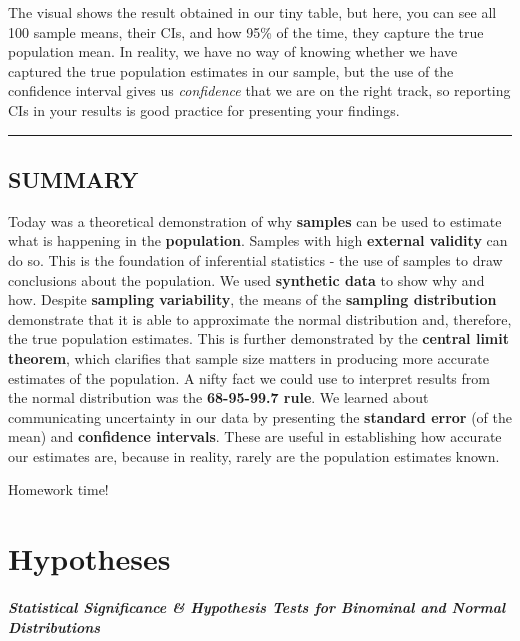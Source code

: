 \documentclass[
]{book}
\begin{document}
The visual shows the result obtained in our tiny table, but here, you can see all 100 sample means, their CIs, and how 95\% of the time, they capture the true population mean. In reality, we have no way of knowing whether we have captured the true population estimates in our sample, but the use of the confidence interval gives us \emph{confidence} that we are on the right track, so reporting CIs in your results is good practice for presenting your findings.

\begin{center}\rule{0.5\linewidth}{0.5pt}\end{center}

\hypertarget{summary-4}{%
\section{SUMMARY}\label{summary-4}}

Today was a theoretical demonstration of why \textbf{samples} can be used to estimate what is happening in the \textbf{population}. Samples with high \textbf{external validity} can do so. This is the foundation of inferential statistics - the use of samples to draw conclusions about the population. We used \textbf{synthetic data} to show why and how. Despite \textbf{sampling variability}, the means of the \textbf{sampling distribution} demonstrate that it is able to approximate the normal distribution and, therefore, the true population estimates. This is further demonstrated by the \textbf{central limit theorem}, which clarifies that sample size matters in producing more accurate estimates of the population. A nifty fact we could use to interpret results from the normal distribution was the \textbf{68-95-99.7 rule}. We learned about communicating uncertainty in our data by presenting the \textbf{standard error} (of the mean) and \textbf{confidence intervals}. These are useful in establishing how accurate our estimates are, because in reality, rarely are the population estimates known.

Homework time!

\hypertarget{hypotheses}{%
\chapter{Hypotheses}\label{hypotheses}}

\hypertarget{statistical-significance-hypothesis-tests-for-binominal-and-normal-distributions}{%
\subsubsection*{\texorpdfstring{\emph{Statistical Significance \& Hypothesis Tests for Binominal and Normal Distributions}}{Statistical Significance \& Hypothesis Tests for Binominal and Normal Distributions}}\label{statistical-significance-hypothesis-tests-for-binominal-and-normal-distributions}}
\end{document}

